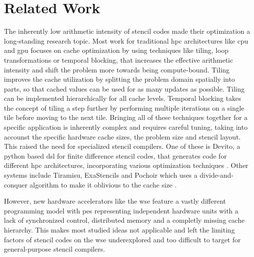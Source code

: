 \chapter{Related Work}
The inherently low arithmetic intensity of stencil codes made their optimization a long-standing research topic.
Most work for traditional \ac{hpc} architectures like \ac{cpu} and \ac{gpu} focuses on cache optimization by using techniques like tiling, loop transformations or temporal blocking, that increases the effective arithmetic intensity and shift the problem more towards being compute-bound.
Tiling improves the cache utilization by splitting the problem domain spatially into parts, so that cached values can be used for as many updates as possible.
Tiling can be implemented hierarchically for all cache levels.
Temporal blocking takes the concept of tiling a step further by performing multiple iterations on a single tile before moving to the next tile.
Bringing all of these techniques together for a specific application is inherently complex and requires careful tuning, taking into accounst the specific hardware cache sizes, the problem size and stencil layout.
This raised the need for specialized stencil compilers.
One of these is Devito, a python based \ac{dsl} for finite difference stencil codes, that generates code for different \ac{hpc} architectures, incorporating various optimization techniques \cite{lange2016devito}. 
Other systems include Tiramisu, ExaStencils and Pochoir which uses a divide-and-conquer algorithm to make it oblivious to the cache size \cite{baghdadi2019tiramisu,lengauer2014exastencils,tang2011pochoir}.

However, new hardware accelerators like the \ac{wse} feature a vastly different programming model with \acp{pe} representing independent hardware units with a lack of synchronized control, distributed memory and a completly missing cache hierarchy. 
This makes most studied ideas not applicable and left the limiting factors of stencil codes on the \ac{wse} underexplored and too difficult to target for general-purpose stencil compilers.

